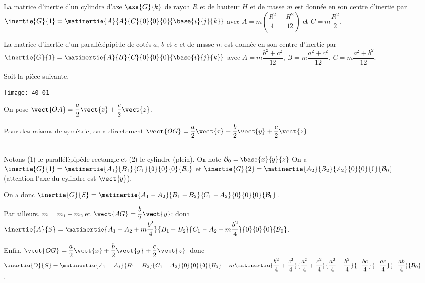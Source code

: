 \normaltrue \difficilefalse \tdifficilefalse
\correctiontrue


\setcounter{question}{0}%
\ifcorrection
\else
{}
\fi

\ifprof
\else
La matrice d'inertie d'un cylindre d'axe $\axe{G}{k}$ de rayon $R$ et de hauteur $H$ et de masse $m$ est donnée en son centre d'inertie par 
$\inertie{G}{1}=\matinertie{A}{A}{C}{0}{0}{0}{\base{i}{j}{k}}$ avec $A=m\left(\dfrac{R^2}{4}+\dfrac{H^2}{12} \right)$ et $C=m\dfrac{R^2}{2}$. 


La matrice d'inertie d'un parallélépipède de cotés $a$, $b$ et $c$ et de masse $m$ est donnée en son centre d'inertie par 
$\inertie{G}{1}=\matinertie{A}{B}{C}{0}{0}{0}{\base{i}{j}{k}}$ avec $A={m\dfrac{b^2+c^2}{12}}$, $B={m\dfrac{a^2+c^2}{12}}$, $C={m\dfrac{a^2+b^2}{12}}$.

Soit la pièce suivante. 
\begin{marginfigure}
\centering
\texttt{[image: 40\_01]}
\end{marginfigure}

On pose $\vect{OA}=\dfrac{a}{2}\vect{x}+\dfrac{c}{2}\vect{z}$. 
\fi



\ifprof
Pour des raisons de symétrie, on a directement $\vect{OG}=\dfrac{a}{2}\vect{x}+\dfrac{b}{2}\vect{y}+\dfrac{c}{2}\vect{z}$.
\else
\fi

\ifprof ~\\
Notons (1) le parallélépipède rectangle et (2) le cylindre (plein). On note $\mathcal{B}_0=\base{x}{y}{z}$
On a $\inertie{G}{1}=\matinertie{A_1}{B_1}{C_1}{0}{0}{0}{\mathcal{B}_0}$ et
$\inertie{G}{2}=\matinertie{A_2}{B_2}{A_2}{0}{0}{0}{\mathcal{B}_0}$ (attention l'axe du cylindre est $\vect{y}$).

On a donc $\inertie{G}{S}=\matinertie{A_1-A_2}{B_1-B_2}{C_1-A_2}{0}{0}{0}{\mathcal{B}_0}$.

Par ailleurs, $m=m_1-m_2$
et $\vect{AG}=\dfrac{b}{2}\vect{y}$; donc $\inertie{A}{S}=\matinertie{A_1-A_2+m\dfrac{b^2}{4}}{B_1-B_2}{C_1-A_2+m\dfrac{b^2}{4}}{0}{0}{0}{\mathcal{B}_0}$.

Enfin, $\vect{OG}=\dfrac{a}{2}\vect{x}+\dfrac{b}{2}\vect{y}+\dfrac{c}{2}\vect{z}$; donc
 $\inertie{O}{S}=
\matinertie{A_1-A_2}{B_1-B_2}{C_1-A_2}{0}{0}{0}{\mathcal{B}_0}
+m\matinertie{\dfrac{b^2}{4}+\dfrac{c^2}{4}}{\dfrac{a^2}{4}+\dfrac{c^2}{4}}{\dfrac{a^2}{4}+\dfrac{b^2}{4}}{-\dfrac{bc}{4}}{-\dfrac{ac}{4}}{-\dfrac{ab}{4}}{\mathcal{B}_0}$.
\else
\fi


\ifprof
\else


\fi